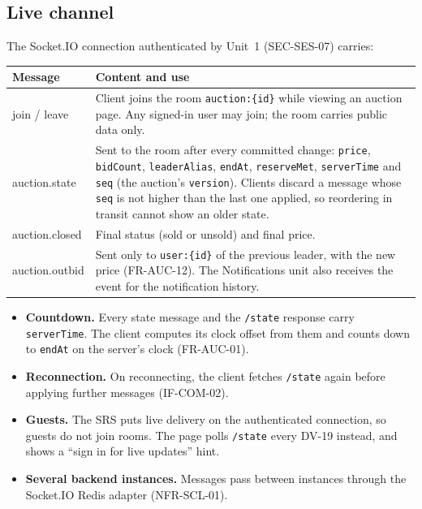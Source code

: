 \documentclass[11pt,a4paper]{article}
\newenvironment{dtable}[1]{\small\begin{longtable}{#1}}{\end{longtable}}
\begin{document}
\subsection{Live channel}
\label{sec:live}
The Socket.IO connection authenticated by Unit~1 (SEC-SES-07) carries:
\begin{dtable}{@{}>{\ttfamily}p{3.9cm}>{\raggedright\arraybackslash}p{11.3cm}@{}}
\toprule
\textnormal{\textbf{Message}} & \textbf{Content and use} \\ \midrule \endhead
join / leave & Client joins the room \texttt{auction:\{id\}} while viewing an auction page. Any signed-in user may join; the room carries public data only. \\
auction.state & Sent to the room after every committed change: \texttt{price}, \texttt{bidCount}, \texttt{leaderAlias}, \texttt{endAt}, \texttt{reserveMet}, \texttt{serverTime} and \texttt{seq} (the auction's \texttt{version}). Clients discard a message whose \texttt{seq} is not higher than the last one applied, so reordering in transit cannot show an older state. \\
auction.closed & Final status (sold or unsold) and final price. \\
auction.outbid & Sent only to \texttt{user:\{id\}} of the previous leader, with the new price (FR-AUC-12). The Notifications unit also receives the event for the notification history. \\
\bottomrule
\end{dtable}
\begin{itemize}[nosep]
  \item \textbf{Countdown.} Every state message and the \texttt{/state} response carry \texttt{serverTime}. The client computes its clock offset from them and counts down to \texttt{endAt} on the server's clock (FR-AUC-01).
  \item \textbf{Reconnection.} On reconnecting, the client fetches \texttt{/state} again before applying further messages (IF-COM-02).
  \item \textbf{Guests.} The SRS puts live delivery on the authenticated connection, so guests do not join rooms. The page polls \texttt{/state} every DV-19 instead, and shows a ``sign in for live updates'' hint.
  \item \textbf{Several backend instances.} Messages pass between instances through the Socket.IO Redis adapter (NFR-SCL-01).
\end{itemize}
\end{document}

